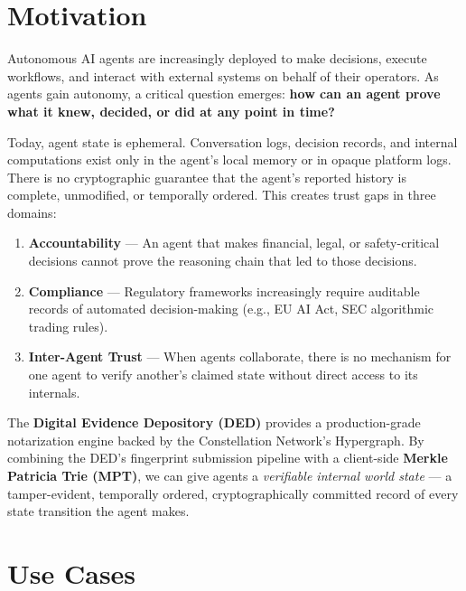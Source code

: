 \documentclass[11pt,a4paper]{article}
\begin{document}
\tableofcontents
\newpage

\section{Motivation}

Autonomous AI agents are increasingly deployed to make decisions, execute workflows, and
interact with external systems on behalf of their operators. As agents gain autonomy, a
critical question emerges: \textbf{how can an agent prove what it knew, decided, or did at
any point in time?}

Today, agent state is ephemeral. Conversation logs, decision records, and internal
computations exist only in the agent's local memory or in opaque platform logs. There is no
cryptographic guarantee that the agent's reported history is complete, unmodified, or
temporally ordered. This creates trust gaps in three domains:

\begin{enumerate}[leftmargin=2cm]
  \item \textbf{Accountability} --- An agent that makes financial, legal, or safety-critical
    decisions cannot prove the reasoning chain that led to those decisions.
  \item \textbf{Compliance} --- Regulatory frameworks increasingly require auditable records
    of automated decision-making (e.g., EU AI Act, SEC algorithmic trading rules).
  \item \textbf{Inter-Agent Trust} --- When agents collaborate, there is no mechanism for
    one agent to verify another's claimed state without direct access to its internals.
\end{enumerate}

The \textbf{Digital Evidence Depository (DED)} provides a production-grade notarization
engine backed by the Constellation Network's Hypergraph. By combining the DED's fingerprint
submission pipeline with a client-side \textbf{Merkle Patricia Trie (MPT)}, we can give
agents a \emph{verifiable internal world state} --- a tamper-evident, temporally ordered,
cryptographically committed record of every state transition the agent makes.

\section{Use Cases}
\end{document}
